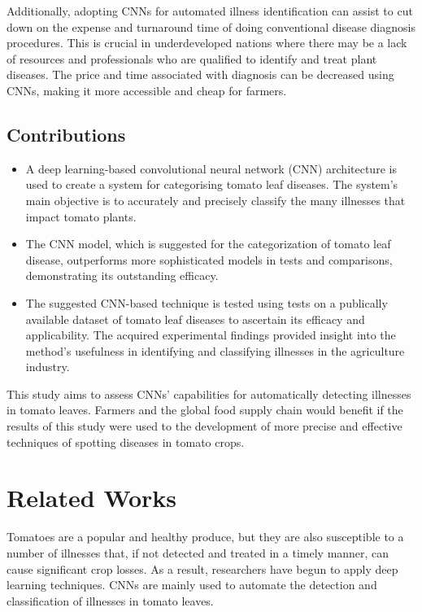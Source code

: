 \documentclass[conference]{IEEEtran}
\begin{document}
Additionally, adopting CNNs for automated illness identification can assist to cut down on the expense and turnaround time of doing conventional disease diagnosis procedures. This is crucial in underdeveloped nations where there may be a lack of resources and professionals who are qualified to identify and treat plant diseases. The price and time associated with diagnosis can be decreased using CNNs, making it more accessible and cheap for farmers.

\subsection{Contributions}

\begin{itemize}
    \item A deep learning-based convolutional neural network (CNN) architecture is used to create a system for categorising tomato leaf diseases. The system's main objective is to accurately and precisely classify the many illnesses that impact tomato plants.
    \item The CNN model, which is suggested for the categorization of tomato leaf disease, outperforms more sophisticated models in tests and comparisons, demonstrating its outstanding efficacy.
    \item The suggested CNN-based technique is tested using tests on a publically available dataset of tomato leaf diseases to ascertain its efficacy and applicability. The acquired experimental findings provided insight into the method's usefulness in identifying and classifying illnesses in the agriculture industry.\\
\end{itemize}
 
This study aims to assess CNNs' capabilities for automatically detecting illnesses in tomato leaves. Farmers and the global food supply chain would benefit if the results of this study were used to the development of more precise and effective techniques of spotting diseases in tomato crops.

\section{Related Works}
Tomatoes are a popular and healthy produce, but they are also susceptible to a number of illnesses that, if not detected and treated in a timely manner, can cause significant crop losses. As a result, researchers have begun to apply deep learning techniques. CNNs are mainly used to automate the detection and classification of illnesses in tomato leaves.\\
\end{document}
